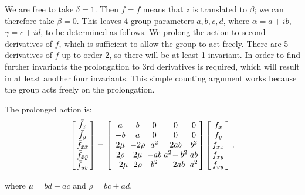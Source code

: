\documentclass[review,onefignum,onetabnum]{siamonline190516}
\begin{document}
We are free to take $\delta=1$. Then $\bar f = f$ means that $z$ is translated to $\beta$; we can therefore take $\beta=0$. This leaves 4 group parameters $a,b,c,d$, where $\alpha = a + i b$, $\gamma = c + i d$, to be determined as follows. We prolong the action to second derivatives of $f$, which is sufficient to allow the group to act freely. There are 5 derivatives of $f$ up to order 2, so there will be at least 1 invariant. In order to find further invariants the prolongation to 3rd derivatives is required, which will result in at least another four invariants. This simple counting argument works because the group acts freely on the prolongation. %

The prolonged action is:
\begin{equation}
\arraycolsep=1.4pt
\left[
\begin{array}{c}
  \bar f_{\bar x} \\ \bar f_{\bar y} \\ \bar f_{\bar x \bar x} \\ \bar f_{\bar x \bar y} \\ \bar f_{\bar y \bar y} 
 \end{array}
 \right]
 = 
\left[
\begin{array}{ccccc}
 a & b & 0 & 0 & 0 \\
 -b & a & 0 & 0 & 0 \\
 2\mu & -2 \rho & a^2 & 2 a b & b^2 \\
 2 \rho & 2\mu & -a b & a^2\!-b^2 & a b \\
 -2\mu & 2 \rho & b^2 & -2 a b & a^2 \\
\end{array}
\right]\left[
\begin{array}{c}
f_x \\ f_y \\ f_{xx} \\ f_{xy} \\ f_{yy} \\
 \end{array}
 \right].
\label{eqn:mobius}
 \end{equation}

\noindent where $\mu = b d - a c$ and $\rho = b c + a d$.
\end{document}

